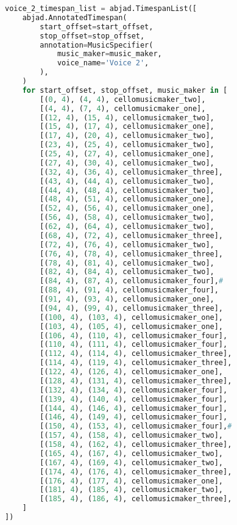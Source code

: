 \begin{lstlisting}[language=Python, caption=Cthar Segment\_I]
voice_2_timespan_list = abjad.TimespanList([
    abjad.AnnotatedTimespan(
        start_offset=start_offset,
        stop_offset=stop_offset,
        annotation=MusicSpecifier(
            music_maker=music_maker,
            voice_name='Voice 2',
        ),
    )
    for start_offset, stop_offset, music_maker in [
        [(0, 4), (4, 4), cellomusicmaker_two],
        [(4, 4), (7, 4), cellomusicmaker_one],
        [(12, 4), (15, 4), cellomusicmaker_two],
        [(15, 4), (17, 4), cellomusicmaker_one],
        [(17, 4), (20, 4), cellomusicmaker_two],
        [(23, 4), (25, 4), cellomusicmaker_two],
        [(25, 4), (27, 4), cellomusicmaker_one],
        [(27, 4), (30, 4), cellomusicmaker_two],
        [(32, 4), (36, 4), cellomusicmaker_three],
        [(43, 4), (44, 4), cellomusicmaker_two],
        [(44, 4), (48, 4), cellomusicmaker_two],
        [(48, 4), (51, 4), cellomusicmaker_one],
        [(52, 4), (56, 4), cellomusicmaker_one],
        [(56, 4), (58, 4), cellomusicmaker_two],
        [(62, 4), (64, 4), cellomusicmaker_two],
        [(68, 4), (72, 4), cellomusicmaker_three],
        [(72, 4), (76, 4), cellomusicmaker_two],
        [(76, 4), (78, 4), cellomusicmaker_three],
        [(78, 4), (81, 4), cellomusicmaker_two],
        [(82, 4), (84, 4), cellomusicmaker_two],
        [(84, 4), (87, 4), cellomusicmaker_four],#
        [(88, 4), (91, 4), cellomusicmaker_four],
        [(91, 4), (93, 4), cellomusicmaker_one],
        [(94, 4), (99, 4), cellomusicmaker_three],
        [(100, 4), (103, 4), cellomusicmaker_one],
        [(103, 4), (105, 4), cellomusicmaker_one],
        [(106, 4), (110, 4), cellomusicmaker_four],
        [(110, 4), (111, 4), cellomusicmaker_four],
        [(112, 4), (114, 4), cellomusicmaker_three],
        [(114, 4), (119, 4), cellomusicmaker_three],
        [(122, 4), (126, 4), cellomusicmaker_one],
        [(128, 4), (131, 4), cellomusicmaker_three],
        [(132, 4), (134, 4), cellomusicmaker_four],
        [(139, 4), (140, 4), cellomusicmaker_four],
        [(144, 4), (146, 4), cellomusicmaker_four],
        [(146, 4), (149, 4), cellomusicmaker_four],
        [(150, 4), (153, 4), cellomusicmaker_four],#
        [(157, 4), (158, 4), cellomusicmaker_two],
        [(158, 4), (162, 4), cellomusicmaker_three],
        [(165, 4), (167, 4), cellomusicmaker_two],
        [(167, 4), (169, 4), cellomusicmaker_two],
        [(174, 4), (176, 4), cellomusicmaker_three],
        [(176, 4), (177, 4), cellomusicmaker_one],
        [(181, 4), (185, 4), cellomusicmaker_two],
        [(185, 4), (186, 4), cellomusicmaker_three],
    ]
])


\end{lstlisting}
